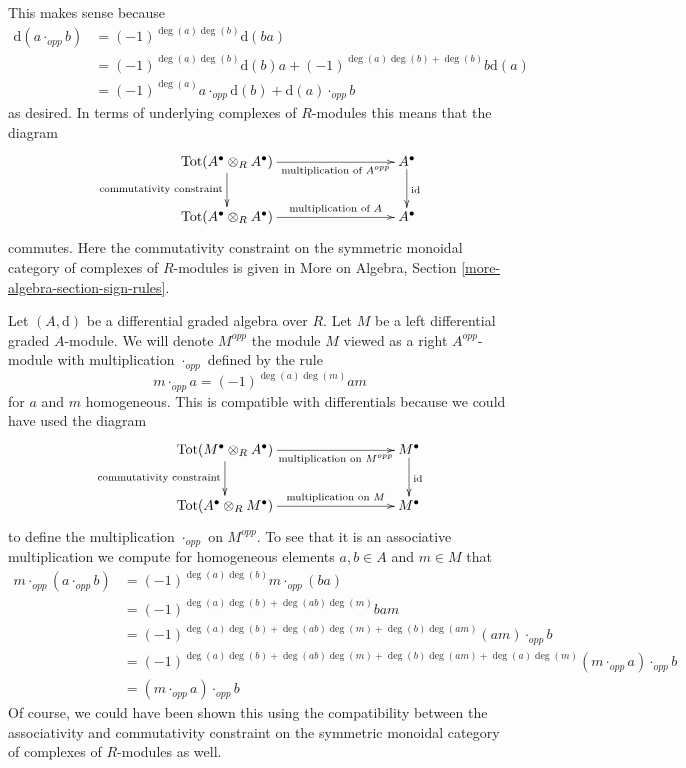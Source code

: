 \documentclass{stacks-project}
\theoremstyle{plain}
\theoremstyle{definition}
\theoremstyle{remark}
\numberwithin{equation}{subsection}
\begin{document}
\noindent
This makes sense because
\begin{align*}
\text{d}(a \cdot_{opp} b)
& =
(-1)^{\deg(a)\deg(b)} \text{d}(b a) \\
& =
(-1)^{\deg(a)\deg(b)} \text{d}(b) a +
(-1)^{\deg(a)\deg(b) + \deg(b)}b\text{d}(a) \\
& =
(-1)^{\deg(a)}a \cdot_{opp} \text{d}(b) + \text{d}(a) \cdot_{opp} b
\end{align*}
as desired. In terms of underlying complexes of $R$-modules
this means that the diagram
$$
\xymatrix{
\text{Tot}(A^\bullet \otimes_R A^\bullet)
\ar[rrr]_-{\text{multiplication of }A^{opp}}
\ar[d]_{\text{commutativity constraint}} & & &
A^\bullet \ar[d]^{\text{id}} \\
\text{Tot}(A^\bullet \otimes_R A^\bullet)
\ar[rrr]^-{\text{multiplication of }A} & & &
A^\bullet
}
$$
commutes. Here the commutativity constraint on the symmetric monoidal
category of complexes of $R$-modules is given in
More on Algebra, Section \ref{more-algebra-section-sign-rules}.

\medskip\noindent
Let $(A, \text{d})$ be a differential graded algebra over $R$.
Let $M$ be a left differential graded $A$-module. We will denote
$M^{opp}$ the module $M$ viewed as a right $A^{opp}$-module with
multiplication $\cdot_{opp}$ defined by the rule
$$
m \cdot_{opp} a = (-1)^{\deg(a)\deg(m)} a m
$$
for $a$ and $m$ homogeneous. This is compatible with differentials
because we could have used the diagram
$$
\xymatrix{
\text{Tot}(M^\bullet \otimes_R A^\bullet)
\ar[rrr]_-{\text{multiplication on }M^{opp}}
\ar[d]_{\text{commutativity constraint}} & & &
M^\bullet \ar[d]^{\text{id}} \\
\text{Tot}(A^\bullet \otimes_R M^\bullet)
\ar[rrr]^-{\text{multiplication on }M} & & &
M^\bullet
}
$$
to define the multiplication $\cdot_{opp}$ on $M^{opp}$.
To see that it is an associative multiplication we compute for
homogeneous elements $a, b \in A$ and $m \in M$ that
\begin{align*}
m \cdot_{opp} (a \cdot_{opp} b)
& =
(-1)^{\deg(a)\deg(b)} m \cdot_{opp} (ba) \\
& =
(-1)^{\deg(a)\deg(b) + \deg(ab)\deg(m)} bam \\
& =
(-1)^{\deg(a)\deg(b) + \deg(ab)\deg(m) + \deg(b)\deg(am)}
(am) \cdot_{opp} b \\
& =
(-1)^{\deg(a)\deg(b) + \deg(ab)\deg(m) + \deg(b)\deg(am) + \deg(a)\deg(m)}
(m \cdot_{opp} a) \cdot_{opp} b \\
& =
(m \cdot_{opp} a) \cdot_{opp} b
\end{align*}
Of course, we could have been shown this using the compatibility between
the associativity and commutativity constraint on the symmetric monoidal
category of complexes of $R$-modules as well.
\end{document}
